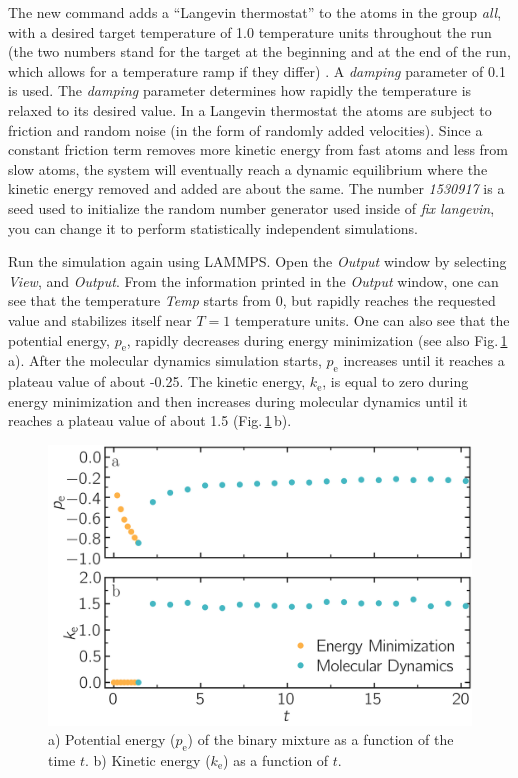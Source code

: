 \documentclass[9pt,tutorial]{livecoms}
\begin{document}
The new command adds a ``Langevin thermostat'' to the atoms in the group
\textit{all}, with a desired target temperature of 1.0 temperature units
throughout the run (the two numbers stand for the target at the beginning
and at the end of the run, which allows for a temperature ramp if
they differ) \cite{schneider1978molecular}.  A \textit{damping}
parameter of 0.1 is used.  The \textit{damping} parameter determines how
rapidly the temperature is relaxed to its desired value.  In a Langevin
thermostat the atoms are subject to friction and random noise (in the form
of randomly added velocities).  Since a constant friction term removes
more kinetic energy from fast atoms and less from slow atoms, the system
will eventually reach a dynamic equilibrium where the kinetic energy
removed and added are about the same.  The number \textit{1530917} is a
seed used to initialize the random number generator used inside of
\textit{fix langevin}, you can change it to perform statistically
independent simulations.

Run the simulation again using LAMMPS. Open the \textit{Output} window
by selecting \textit{View}, and \textit{Output}. From the information
printed in the \textit{Output} window, one can see that the temperature
\textit{Temp} starts from 0, but rapidly reaches the requested value and
stabilizes itself near $T=1$ temperature units.  One can also see that
the potential energy, $p_\text{e}$, rapidly decreases during energy
minimization (see also Fig.\,\ref{fig:evolution-energy}\,a). After
the molecular dynamics simulation starts, $p_\text{e}$ increases until
it reaches a plateau value of about -0.25. The kinetic energy,
$k_\text{e}$, is equal to zero during energy minimization and then
increases during molecular dynamics until it reaches a plateau value of
about 1.5 (Fig.\,\ref{fig:evolution-energy}\,b).

\begin{figure}
\centering
\includegraphics[width=\linewidth]{LJ-energy}
\caption{a) Potential energy ($p_\text{e}$) of the binary mixture as a function
of the time $t$. b) Kinetic energy ($k_\text{e}$) as a function of $t$.}
\label{fig:evolution-energy}
\end{figure}
\end{document}
